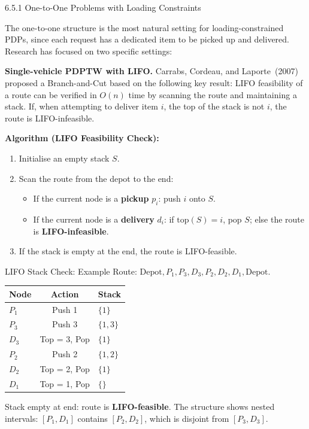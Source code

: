 \documentclass[aspectratio=169,10pt]{beamer}
\begin{document}
\begin{frame}[allowframebreaks]{6.5.1 One-to-One Problems with Loading Constraints}

  The one-to-one structure is the most natural setting for loading-constrained PDPs,
  since each request has a dedicated item to be picked up and delivered. Research has
  focused on two specific settings:

  \textbf{Single-vehicle PDPTW with LIFO.}  Carrabs, Cordeau, and Laporte~(2007)
  proposed a Branch-and-Cut based on the following key result: LIFO feasibility of a
  route can be verified in $O(n)$ time by scanning the route and maintaining a stack.
  If, when attempting to deliver item $i$, the top of the stack is not $i$, the route
  is LIFO-infeasible.

  \textbf{Algorithm (LIFO Feasibility Check):}
  \begin{enumerate}
    \item Initialise an empty stack $S$.
    \item Scan the route from the depot to the end:
      \begin{itemize}
        \item If the current node is a \textbf{pickup} $p_i$: push $i$ onto $S$.
        \item If the current node is a \textbf{delivery} $d_i$: if $\text{top}(S) = i$,
              pop $S$; else the route is \textbf{LIFO-infeasible}.
      \end{itemize}
    \item If the stack is empty at the end, the route is LIFO-feasible.
  \end{enumerate}

  \begin{exampleblock}{LIFO Stack Check: Example}
    Route: $\text{Depot}, P_1, P_3, D_3, P_2, D_2, D_1, \text{Depot}$.
    \begin{center}
      \begin{tabular}{lcl}
        \toprule
        \textbf{Node} & \textbf{Action} & \textbf{Stack} \\
        \midrule
        $P_1$ & Push 1 & $\{1\}$ \\
        $P_3$ & Push 3 & $\{1, 3\}$ \\
        $D_3$ & Top = 3, Pop & $\{1\}$ \\
        $P_2$ & Push 2 & $\{1, 2\}$ \\
        $D_2$ & Top = 2, Pop & $\{1\}$ \\
        $D_1$ & Top = 1, Pop & $\{\}$ \\
        \bottomrule
      \end{tabular}
    \end{center}
    Stack empty at end: route is \textbf{LIFO-feasible}. \checkmark
    The structure shows nested intervals: $[P_1,D_1]$ contains $[P_2,D_2]$, which
    is disjoint from $[P_3,D_3]$.
  \end{exampleblock}


\end{frame}
\end{document}
